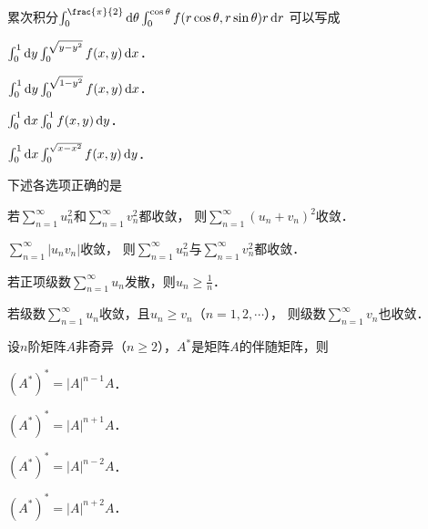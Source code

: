 \documentclass[plain,noanswer,medmath]{../../template/jnuexam}
\begin{document}


\begin{problem}
累次积分$\int_0^{\frac{\pi}{2}} \d\theta \int_0^{\cos \theta} f(r\cos \theta ,r\sin \theta) r\dr$
可以写成\pickout{}
\begin{abcd}
\item $\int_0^1\mathop{}\!\mathrm{d} y\int_0^{\sqrt{y - y^2}} f(x,y) \mathop{}\!\mathrm{d} x$．				
\item $\int_0^1\mathop{}\!\mathrm{d} y\int_0^{\sqrt{1 - y^2}} f(x,y) \mathop{}\!\mathrm{d} x$．
\item $\int_0^1\mathop{}\!\mathrm{d} x\int_0^1f(x,y) \mathop{}\!\mathrm{d} y$．					
\item $\int_0^1\mathop{}\!\mathrm{d} x\int_0^{\sqrt{x - x^2}} f(x,y) \mathop{}\!\mathrm{d} y$．
\end{abcd}
\end{problem}


\begin{problem}
下述各选项正确的是\pickout{}
\begin{abcd}
\item 若$\sum_{n = 1}^{\infty}u_n^2$和$\sum_{n = 1}^{\infty}v_n^2$都收敛，
      则$\sum_{n = 1}^{\infty}(u_n^{} + v_n)^2$收敛．
\item $\sum_{n = 1}^{\infty}\left| u_n^{}v_n \right|$收敛，
      则$\sum_{n = 1}^{\infty}u_n^2$与$\sum_{n = 1}^{\infty}v_n^2$都收敛．
\item 若正项级数$\sum_{n = 1}^{\infty}u_n^{}$发散，则$u_n^{} \ge \frac{1}{n}$．
\item 若级数$\sum_{n = 1}^{\infty}u_n^{}$收敛，且$u_n^{} \ge v_n$（$n = 1,2, \cdots$），
      则级数$\sum_{n = 1}^{\infty}v_n^{}$也收敛．
\end{abcd}
\end{problem}


\begin{problem}
设$n$阶矩阵$A$非奇异（$n \ge 2$），$A^*$是矩阵$A$的伴随矩阵，则\pickout{}
\begin{abcd}
\item $(A^*)^* = |A|^{n - 1} A$．		
\item $(A^*)^* = |A|^{n + 1} A$．
\item $(A^*)^* = |A|^{n - 2} A$．		
\item $(A^*)^* = |A|^{n + 2} A$．
\end{abcd}
\end{problem}
\end{document}
